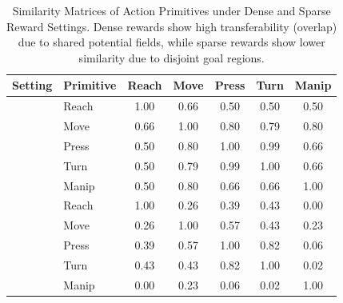 \documentclass{article}
\begin{document}
\begin{table}[htbp]
\centering
\caption{Similarity Matrices of Action Primitives under Dense and Sparse Reward Settings. 
Dense rewards show high transferability (overlap) due to shared potential fields, while sparse rewards show lower similarity due to disjoint goal regions.}
\label{tab:sim_matrices}
\renewcommand{\arraystretch}{1.2}
\setlength{\tabcolsep}{5pt}

\begin{tabular}{l l S S S S S}
\toprule
\textbf{Setting} & \textbf{Primitive} & {\textbf{Reach}} & {\textbf{Move}} & {\textbf{Press}} & {\textbf{Turn}} & {\textbf{Manip}} \\
\midrule

& Reach & 1.00 & 0.66 & 0.50 & 0.50 & 0.50 \\
& Move  & 0.66 & 1.00 & 0.80 & 0.79 & 0.80 \\
& Press & 0.50 & 0.80 & 1.00 & 0.99 & 0.66 \\
& Turn  & 0.50 & 0.79 & 0.99 & 1.00 & 0.66 \\
& Manip & 0.50 & 0.80 & 0.66 & 0.66 & 1.00 \\
\midrule

& Reach & 1.00 & 0.26 & 0.39 & 0.43 & 0.00 \\
& Move  & 0.26 & 1.00 & 0.57 & 0.43 & 0.23 \\
& Press & 0.39 & 0.57 & 1.00 & 0.82 & 0.06 \\
& Turn  & 0.43 & 0.43 & 0.82 & 1.00 & 0.02 \\
& Manip & 0.00 & 0.23 & 0.06 & 0.02 & 1.00 \\

\bottomrule
\end{tabular}
\end{table}



\end{document}
